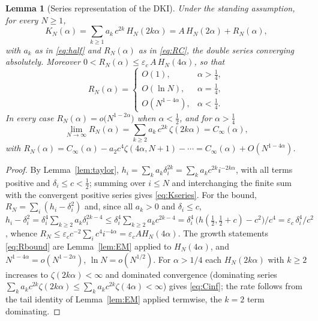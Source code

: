 \documentclass[11pt,reqno]{amsart}
\theoremstyle{plain}
\newtheorem{lemma}[theorem]{Lemma}
\theoremstyle{definition}
\theoremstyle{remark}
\numberwithin{equation}{section}
\begin{document}
\begin{lemma}[Series representation of the DKI]\label{lem:series}
Under the standing assumption, for every $N\ge1$,
\begin{equation}\label{eq:Kseries}
K_N(\alpha)=\sum_{k\ge1}a_k\,c^{2k}\,H_N(2k\alpha)=A\,H_N(2\alpha)+R_N(\alpha),
\end{equation}
with $a_k$ as in \eqref{eq:half} and $R_N(\alpha)$ as in \eqref{eq:RC}, the double series converging absolutely. Moreover $0<R_N(\alpha)\le\varepsilon_c\,A\,H_N(4\alpha)$, so that
\begin{equation}\label{eq:Rbound}
R_N(\alpha)=
\begin{cases}
O(1), & \alpha>\tfrac14,\\
O(\ln N), & \alpha=\tfrac14,\\
O(N^{1-4\alpha}), & \alpha<\tfrac14 .
\end{cases}
\end{equation}
In every case $R_N(\alpha)=o\bigl(N^{1-2\alpha}\bigr)$ when $\alpha<\tfrac12$, and for $\alpha>\tfrac14$
\begin{equation}\label{eq:Cinf}
\lim_{N\to\infty}R_N(\alpha)=\sum_{k\ge2}a_k\,c^{2k}\,\zeta(2k\alpha)=C_\infty(\alpha),
\end{equation}
with $R_N(\alpha)=C_\infty(\alpha)-a_2c^4\zeta(4\alpha,N+1)-\cdots=C_\infty(\alpha)+O(N^{1-4\alpha})$.
\end{lemma}

\begin{proof}
By Lemma~\ref{lem:taylor}, $h_i=\sum_ka_k\delta_i^{2k}=\sum_ka_kc^{2k}i^{-2k\alpha}$, with all terms positive and $\delta_i\le c<\frac12$; summing over $i\le N$ and interchanging the finite sum with the convergent positive series gives \eqref{eq:Kseries}. For the bound, $R_N=\sum_i(h_i-\delta_i^2)$ and, since all $a_k>0$ and $\delta_i\le c$, $h_i-\delta_i^2=\delta_i^4\sum_{k\ge2}a_k\delta_i^{2k-4}\le\delta_i^4\sum_{k\ge2}a_kc^{2k-4}=\delta_i^4\,\bigl(h(\tfrac12,\tfrac12+c)-c^2\bigr)/c^4=\varepsilon_c\,\delta_i^4/c^2$, whence $R_N\le\varepsilon_c c^{-2}\sum_i c^4i^{-4\alpha}=\varepsilon_cAH_N(4\alpha)$. The growth statements \eqref{eq:Rbound} are Lemma~\ref{lem:EM} applied to $H_N(4\alpha)$, and $N^{1-4\alpha}=o(N^{1-2\alpha})$, $\ln N=o(N^{1/2})$. For $\alpha>1/4$ each $H_N(2k\alpha)$ with $k\ge2$ increases to $\zeta(2k\alpha)<\infty$ and dominated convergence (dominating series $\sum_ka_kc^{2k}\zeta(2k\alpha)\le\sum_ka_kc^{2k}\zeta(4\alpha)<\infty$) gives \eqref{eq:Cinf}; the rate follows from the tail identity of Lemma~\ref{lem:EM} applied termwise, the $k=2$ term dominating.
\end{proof}
\end{document}
